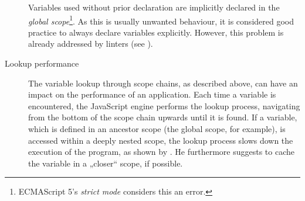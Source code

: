 \begin{description}
Variables used without prior declaration are implicitly declared in the
\emph{global
scope}\footnote{ECMAScript 5’s \emph{strict mode} considers this an error.}.
As this is usually unwanted behaviour, it is considered good practice to
always declare variables explicitly. However, this problem is already
addressed by linters (see ).
\item[Lookup performance]
The variable lookup through scope chains, as described above, can have
an impact on the performance of an application. Each time a variable is
encountered, the JavaScript engine performs the lookup process,
navigating from the bottom of the scope chain upwards until it is found.
If a variable, which is defined in an ancestor scope (the global scope,
for example), is accessed within a deeply nested scope, the lookup
process slows down the execution of the program, as shown by
. He furthermore suggests to cache the variable in
a „closer“ scope, if possible.
\end{description}
